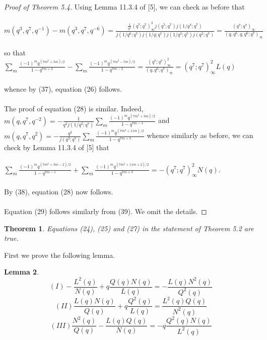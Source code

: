 \documentclass[10pt,reqno]{amsart}
\newtheorem{theorem}{Theorem}[section]
\newtheorem{lemma}[theorem]{Lemma}
\begin{document}
\begin{proof}[Proof of Theorem 5.4]
Using Lemma 11.3.4 of [5], we can check as before that\\ \\ $m(q^3,q^7,q^{-1})-m(q^3,q^7,q^{-6})=\displaystyle\frac{\displaystyle\frac{1}{q^6}(q^7;q^7)_{\infty}^3j(q^5;q^7)j(1/q^4;q^7)}{j(1/q^6;q^7)j(1/q;q^7)j(1/q^3;q^7)j(q^2;q^7)}=\displaystyle\frac{(q^7;q^7)_{\infty}}{(q,q^6,q,q^6;q^7)_{\infty}}$ \\ \\
so that $\displaystyle\sum_{m}\displaystyle\frac{(-1)^mq^{(7m^2+5m)/2}}{1-q^{7m+2}}-\displaystyle\sum_{m}\displaystyle\frac{(-1)^mq^{(7m^2-5m)/2}}{1-q^{7m-3}}=\displaystyle\frac{(q^7;q^7)_{\infty}^2}{(q,q^6;q^7)_{\infty}}=(q^7;q^7)_{\infty}^2L(q)$ \\ \\whence by (37), equation (26) follows.\\ \\
The proof of equation (28) is similar. Indeed, $m(q,q^7,q^{-2})=-\displaystyle\frac{1}{q^2j(1/q^2;q^7)}\displaystyle\sum_{m}\displaystyle\frac{(-1)^mq^{(7m^2+3m)/2}}{1-q^{7m-1}}$ and $m(q,q^7,q^{2})=-\displaystyle\frac{q^2}{j(q^2;q^7)}\displaystyle\sum_{m}\displaystyle\frac{(-1)^mq^{(7m^2+11m)/2}}{1-q^{7m+3}}$ whence similarly as before, we can check by Lemma 11.3.4 of [5] that \\ \\$\displaystyle\sum_{m}\displaystyle\frac{(-1)^mq^{(7m^2+3m-2)/2}}{1-q^{7m-1}}+\displaystyle\sum_{m}\displaystyle\frac{(-1)^mq^{(7m^2+11m+2)/2}}{1-q^{7m+3}}=-(q^7;q^7)_{\infty}^2N(q).$ \\ \\By (38), equation (28) now follows. \\ \\ Equation (29) follows similarly from (39). We omit the details.
\end{proof}
\begin{theorem}
Equations (24), (25) and (27) in the statement of Theorem 5.2 are true.
\end{theorem}
First we prove the following lemma.
\begin{lemma}
\begin{equation*}
    (I) -\displaystyle\frac{L^2(q)}{N(q)}+q\displaystyle\frac{Q(q)N(q)}{L(q)}=-\displaystyle\frac{L(q)N^2(q)}{Q^2(q)} 
\end{equation*}
\begin{equation*}
    (II) \displaystyle\frac{L(q)N(q)}{Q(q)}+q\displaystyle\frac{Q^2(q)}{L(q)}=\displaystyle\frac{L^2(q)Q(q)}{N^2(q)} 
\end{equation*}
\begin{equation*}
    (III) \displaystyle\frac{N^2(q)}{Q(q)}-\displaystyle\frac{L(q)Q(q)}{N(q)}=-q\displaystyle\frac{Q^2(q)N(q)}{L^2(q)}
\end{equation*}
\end{lemma}
\end{document}
